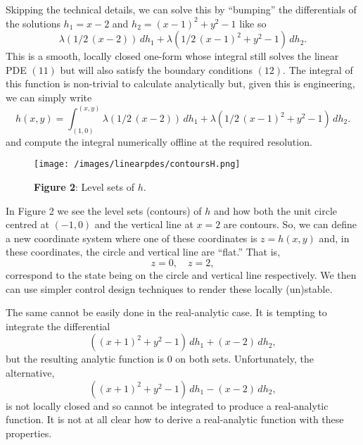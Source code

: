 Skipping the technical details, we can solve this by ``bumping'' the differentials of the solutions \(h_1 = x - 2\) and \(h_2 = (x-1)^2 + y^2 - 1\) like so
\[
  \lambda(1/2\,(x - 2))\, dh_1
  +
  \lambda(1/2\,(x - 1)^2 + y^2 - 1)\, dh_2.
\]
This is a smooth, locally closed one-form whose integral still solves the linear PDE \((11)\) but will also satisfy the boundary conditions \((12)\).
The integral of this function is non-trivial to calculate analytically but, given this is engineering, we can simply write
\[
  h(x, y)
    =
      \int_{(1, 0)}^{(x, y)} 
        \lambda(1/2\,(x - 2))\, dh_1
        +
        \lambda(1/2\,(x - 1)^2 + y^2 - 1)\, dh_2.
\]
and compute the integral numerically offline at the required resolution.
\begin{figure}
  \texttt{[image: /images/linearpdes/contoursH.png]}
  \caption{%
    \textbf{Figure 2}: Level sets of \(h.\)
  }
\end{figure}
In Figure 2 we see the level sets (contours) of \(h\) and how both the unit circle centred at \((-1, 0)\) and the vertical line at \(x = 2\) are contours.
So, we can define a new coordinate system where one of these coordinates is \(z = h(x,y)\) and, in these coordinates, the circle and vertical line are ``flat.''
That is,
\[
  z = 0, \quad z = 2,
\]
correspond to the state being on the circle and vertical line respectively.
We then can use simpler control design techniques to render these locally (un)stable.

The same cannot be easily done in the real-analytic case.
It is tempting to integrate the differential
\[
  ((x + 1)^2 + y^2 - 1)\, dh_1
  +
  (x - 2)\, dh_2,
\]
but the resulting analytic function is \(0\) on both sets.
Unfortunately, the alternative,
\[
  ((x + 1)^2 + y^2 - 1)\, dh_1
  -
  (x - 2)\, dh_2,
\]
is not locally closed and so cannot be integrated to produce a real-analytic function.
It is not at all clear how to derive a real-analytic function with these properties.